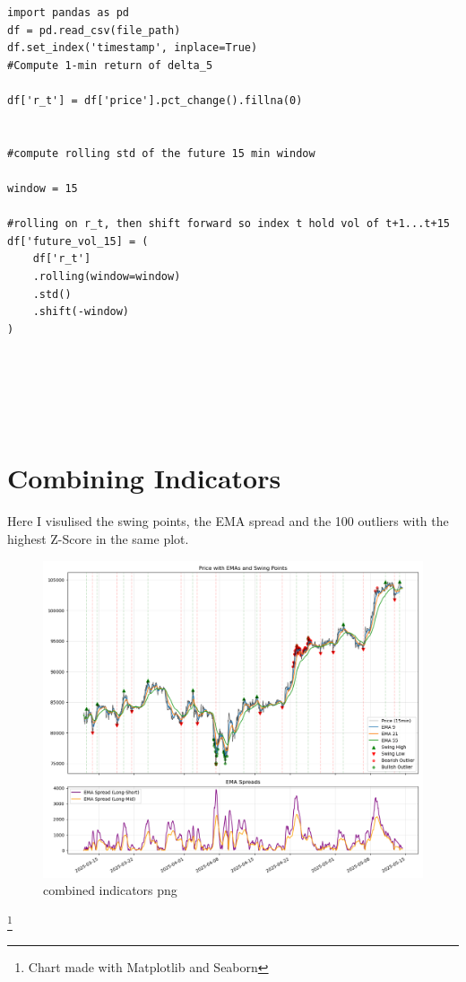\documentclass[12pt]{article}
\begin{document}
\begin{verbatim}
import pandas as pd
df = pd.read_csv(file_path)
df.set_index('timestamp', inplace=True)
#Compute 1-min return of delta_5

df['r_t'] = df['price'].pct_change().fillna(0)


#compute rolling std of the future 15 min window

window = 15

#rolling on r_t, then shift forward so index t hold vol of t+1...t+15
df['future_vol_15] = (
    df['r_t']
    .rolling(window=window)
    .std()
    .shift(-window)
)






\end{verbatim}


\newpage

\section*{Combining Indicators}
Here I visulised the swing points, the EMA spread and the 100 outliers with the highest Z-Score in the same plot.

\begin{figure}[H]
    \centering
    \includegraphics[width=\textwidth]{imgs/swingpoints_emaspread_priceOutliers.png}
    \caption{combined indicators png}
\end{figure}

\footnote{Chart made with Matplotlib and Seaborn}
\end{document}
